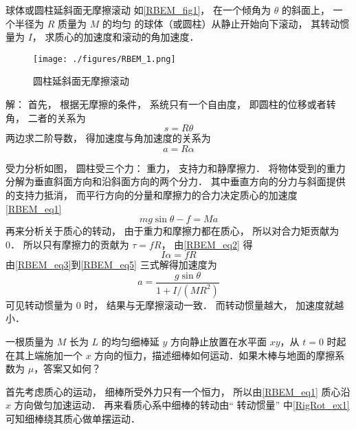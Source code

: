 \begin{example}{球体或圆柱延斜面无摩擦滚动}\label{RBEM_ex1}
如\autoref{RBEM_fig1}， 在一个倾角为 $\theta$ 的斜面上， 一个半径为 $R$ 质量为 $M$ 的均匀 的球体（或圆柱）从静止开始向下滚动， 其转动惯量为 $I$， 求质心的加速度和滚动的角加速度．

\begin{figure}[ht]
\centering
\texttt{[image: ./figures/RBEM\_1.png]}
\caption{圆柱延斜面无摩擦滚动} \label{RBEM_fig1}
\end{figure}

解： 首先， 根据无摩擦的条件， 系统只有一个自由度， 即圆柱的位移或者转角， 二者的关系为
\begin{equation}
s = R\theta
\end{equation}
两边求二阶导数， 得加速度与角加速度的关系为
\begin{equation}\label{RBEM_eq3}
a = R\alpha
\end{equation}

受力分析如图， 圆柱受三个力： 重力， 支持力和静摩擦力． 将物体受到的重力分解为垂直斜面方向和沿斜面方向的两个分力． 其中垂直方向的分力与斜面提供的支持力抵消， 而平行方向的分量和摩擦力的合力决定质心的加速度\autoref{RBEM_eq1}
\begin{equation}\label{RBEM_eq4}
mg\sin\theta - f = Ma
\end{equation}
再来分析关于质心的转动， 由于重力和摩擦力都在质心， 所以对合力矩贡献为 0． 所以只有摩擦力的贡献为 $\tau = fR$， 由\autoref{RBEM_eq2} 得
\begin{equation}\label{RBEM_eq5}
I\alpha = f R
\end{equation}
由\autoref{RBEM_eq3}到\autoref{RBEM_eq5} 三式解得加速度为
\begin{equation}
a = \frac{g \sin\theta}{1 + I/(MR^2)}
\end{equation}
可见转动惯量为 0 时， 结果与无摩擦滚动一致． 而转动惯量越大， 加速度就越小．
\end{example}

\begin{example}{}
一根质量为 $M$ 长为 $L$ 的均匀细棒延 $y$ 方向静止放置在水平面 $xy$，从 $t=0$ 时起在其上端施加一个 $x$ 方向的恒力，描述细棒如何运动．如果木棒与地面的摩擦系数为 $\mu$，答案又如何？

首先考虑质心的运动， 细棒所受外力只有一个恒力， 所以由\autoref{RBEM_eq1} 质心沿 $x$ 方向做匀加速运动． 再来看质心系中细棒的转动由“ 转动惯量” 中\autoref{RigRot_ex1} 可知细棒绕其质心做单摆运动．
\end{example}
